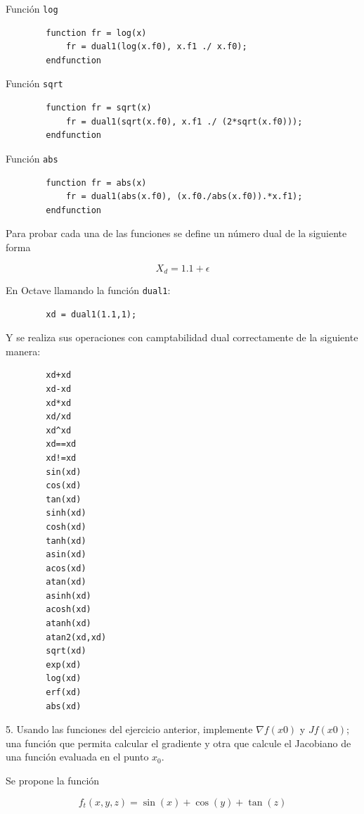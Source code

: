 \documentclass[a4paper, 12pt]{article}
\begin{document}
    Función \verb|log|

    \begin{verbatim}
        function fr = log(x)
            fr = dual1(log(x.f0), x.f1 ./ x.f0);
        endfunction
    \end{verbatim}

    Función \verb|sqrt|

    \begin{verbatim}
        function fr = sqrt(x)
            fr = dual1(sqrt(x.f0), x.f1 ./ (2*sqrt(x.f0)));
        endfunction
    \end{verbatim}

    Función \verb|abs|

    \begin{verbatim}
        function fr = abs(x)
            fr = dual1(abs(x.f0), (x.f0./abs(x.f0)).*x.f1);
        endfunction
    \end{verbatim}

    Para probar cada una de las funciones se define un número dual de la siguiente forma

    \[
        X_d = 1.1 + \epsilon
    \]

    En Octave llamando la función \verb|dual1|:

    \begin{verbatim}
        xd = dual1(1.1,1);
    \end{verbatim}

    Y se realiza sus operaciones con camptabilidad dual correctamente de la siguiente manera:

    \begin{verbatim}
        xd+xd
        xd-xd
        xd*xd
        xd/xd
        xd^xd
        xd==xd
        xd!=xd
        sin(xd)
        cos(xd)
        tan(xd)
        sinh(xd)
        cosh(xd)
        tanh(xd)
        asin(xd)
        acos(xd)
        atan(xd)
        asinh(xd)
        acosh(xd)
        atanh(xd)
        atan2(xd,xd)
        sqrt(xd)
        exp(xd)
        log(xd)
        erf(xd)
        abs(xd)
    \end{verbatim}

    5. Usando las funciones del ejercicio anterior, implemente $\nabla f(x0)$ y $Jf(x0)$; una función que permita calcular el gradiente y otra que calcule el Jacobiano de una función evaluada en el punto $x_0$.

    Se propone la función

    \[
        f_t(x,y,z) = \sin(x) + \cos(y)+ \tan(z)
    \]
\end{document}
